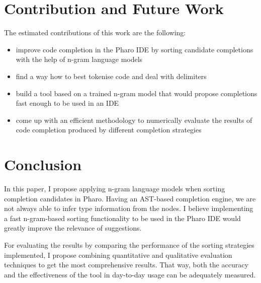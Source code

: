 \documentclass[sigconf,screen]{acmart}
\begin{document}
\section{Contribution and Future Work}
The estimated contributions of this work are the following:
\begin{itemize}
  \item improve code completion in the Pharo IDE by sorting candidate completions with the help of n-gram language models
  \item find a way how to best tokenise code and deal with delimiters
  \item build a tool based on a trained n-gram model that would propose completions fast enough to be used in an IDE
  \item come up with an efficient methodology to numerically evaluate the results of code completion produced by different completion strategies
\end{itemize}

\section{Conclusion}
In this paper, I propose applying n-gram language models when sorting completion candidates in Pharo. Having an AST-based completion engine, we are not always able to infer type information from the nodes. I believe implementing a fast n-gram-based sorting functionality to be used in the Pharo IDE would greatly improve the relevance of suggestions.

For evaluating the results by comparing the performance of the sorting strategies implemented, I propose combining quantitative and qualitative evaluation techniques to get the most comprehensive results. That way, both the accuracy and the effectiveness of the tool in day-to-day usage can be adequately measured.



\end{document}
